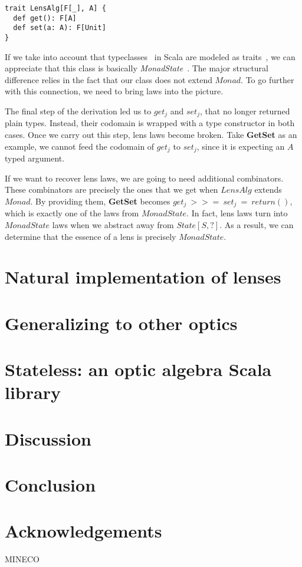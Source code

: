 \documentclass[final, twocolumn, 3p]{elsarticle}
\begin{document}
\begin{lstlisting}
trait LensAlg[F[_], A] {
  def get(): F[A]
  def set(a: A): F[Unit]
}
\end{lstlisting}

If we take into account that typeclasses~\cite{wadler1989make} in Scala are
modeled as traits~\cite{oliveira2010type}, we can appreciate that this class is
basically \emph{MonadState}~\cite{gibbons2012unifying}. The major structural
difference relies in the fact that our class does not extend $Monad$. To go
further with this connection, we need to bring laws into the picture.

The final step of the derivation led us to $get_j$ and $set_j$, that no longer
returned plain types. Instead, their codomain is wrapped with a type constructor
in both cases. Once we carry out this step, lens laws become broken. Take
\textbf{GetSet} as an example, we cannot feed the codomain of $get_j$ to
$set_j$, since it is expecting an $A$ typed argument.

If we want to recover lens laws, we are going to need additional combinators.
These combinators are precisely the ones that we get when $LensAlg$ extends
$Monad$. By providing them, \textbf{GetSet} becomes $get_j\ >>=\ set_j\ =\
return()$, which is exactly one of the laws from $MonadState$. In fact, lens
laws turn into $MonadState$ laws when we abstract away from $State[S, ?]$. As a
result, we can determine that the essence of a lens is precisely $MonadState$.

\section{Natural implementation of lenses}
\label{sec:Natural}

\section{Generalizing to other optics}
\label{sec:Generalizing}

\section{Stateless: an optic algebra Scala library}
\label{sec:Stateless}

\section{Discussion}
\label{sec:Discussion}

\section{Conclusion}

\section*{Acknowledgements}
MINECO

{}

\end{document}
